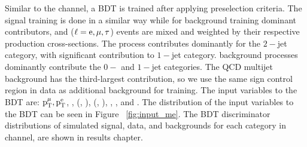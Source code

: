 Similar to the \Hmuhad channel, a BDT is trained after applying preselection criteria. The signal training is done in a similar way while for background training dominant contributors, \ttbar and \Zll ($\ell=\text{e}, \mu, \tau$) events are mixed and weighted by their respective production cross-sections. The \ttbar process contributes dominantly for the $2-$jet category, with significant contribution to $1-$jet category. \Zll background processes dominantly contribute the $0-$ and $1-$jet categories. The QCD multijet background has the third-largest contribution, so we use the same sign control region in data as additional background for training. The input variables to the BDT are: $\text{p}_\text{T}^{\mu}, \text{p}_\text{T}^{\text{e}}$, \mcol, \mt(\Pgm, \ptvecmiss), \mt(\Pe, \ptvecmiss), \dphiem, \dphimmet, and \dphiemet. The distribution of the input variables to the BDT can be seen in Figure ~\ref{fig:input_me}. The BDT discriminator distributions of simulated signal, data, and backgrounds for each category in \Hmue channel, are shown in results chapter.

